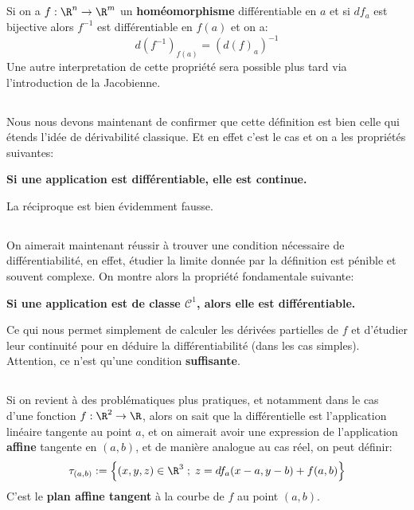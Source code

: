 \subsection*{}
Si on a \(f : \R^n \rightarrow \R^m\) un \textbf{homéomorphisme} différentiable en \(a\) et si \(df_a\) est bijective alors \(f^{-1}\) est différentiable en \(f(a)\) et on a:
\[
   d(f^{-1})_{f(a)} = (d(f)_a)^{-1}   
\]
Une autre interpretation de cette propriété sera possible plus tard via l'introduction de la Jacobienne.

\subsection*{}
Nous nous devons maintenant de confirmer que cette définition est bien celle qui étends l'idée de dérivabilité classique. Et en effet c'est le cas et on a les propriétés suivantes:
\begin{center}
   \textbf{Si une application est différentiable, elle est continue.}
\end{center}
La réciproque est bien évidemment fausse.
\subsection*{}
On aimerait maintenant réussir à trouver une condition nécessaire de différentiabilité, en effet, étudier la limite donnée par la définition est pénible et souvent complexe.\+
On montre alors la propriété fondamentale suivante:
\begin{center}
   \textbf{Si une application est de classe \(\mathcal{C}^1\), alors elle est différentiable.}
\end{center}
Ce qui nous permet simplement de calculer les dérivées partielles de \(f\) et d'étudier leur continuité pour en déduire la différentiabilité (dans les cas simples). Attention, ce n'est qu'une condition \textbf{suffisante}.
\subsection*{}
Si on revient à des problématiques plus pratiques, et notamment dans le cas d'une fonction \(f : \R^2 \rightarrow \R\), alors on sait que la différentielle est l'application linéaire tangente au point \(a\), et on aimerait avoir une expression de l'application \textbf{affine} tangente en \((a, b)\), et de manière analogue au cas réel, on peut définir:
\[
   \tau_{(a, b)} := \Bigl\{ (x, y, z) \in \R^3 \; ; \; z = df_a(x - a, y - b) + f(a, b) \Bigl\}    
\]
C'est le \textbf{plan affine tangent} à la courbe de \(f\) au point \((a, b)\).

